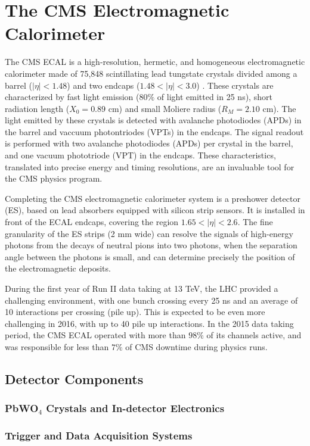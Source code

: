 \chapter{The CMS Electromagnetic Calorimeter}

The CMS ECAL is a high-resolution, hermetic, and homogeneous electromagnetic calorimeter made of 75,848 scintillating lead tungstate crystals divided among a barrel ($|\eta| < 1.48$) and two endcaps ($1.48 < |\eta| < 3.0$) \cite{ECALTDR}.
These crystals are characterized by fast light emission ($80\%$ of light emitted in 25 ns), short radiation length ($X_0 = 0.89$ cm) and small Moliere radius ($R_M = 2.10$ cm). The light emitted by these crystals is detected with avalanche photodiodes (APDs) in the barrel and vaccuum photontriodes (VPTs) in the endcaps. The signal readout is performed with two avalanche photodiodes (APDs) per crystal in the barrel, and one vacuum phototriode (VPT) in the endcaps. These characteristics, translated into precise energy and timing resolutions, are an invaluable tool for the CMS physics program.

Completing the CMS electromagnetic calorimeter system is a preshower detector (ES), based on lead absorbers equipped with silicon strip sensors. It is installed in front of the ECAL endcaps, covering the region $1.65 < |\eta| < 2.6$. The fine granularity of the ES strips (2 mm wide) can resolve the signals of high-energy photons from the decays of neutral pions into two photons, when the separation angle between the photons is small, and can determine precisely the position of the electromagnetic deposits.

During the first year of Run II data taking at 13 TeV, the LHC provided a challenging environment, with one bunch crossing every 25 ns and an average of 10 interactions per crossing (pile up). This is expected to be even more challenging in 2016, with up to 40 pile up interactions. In the 2015 data taking period, the CMS ECAL operated with more than $98\%$ of its channels active, and was responsible for less than $7\%$ of CMS downtime during physics runs.


\section{Detector Components}
\subsection{PbWO$_4$ Crystals and In-detector Electronics}
\subsection{Trigger and Data Acquisition Systems}
